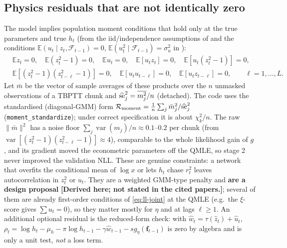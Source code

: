 \documentclass[11pt]{article}
\newcommand{\F}{\mathcal{F}}
\newcommand{\E}{\mathbb{E}}
\newcommand{\derived}{\textbf{[Derived here; not stated in the cited papers.]}}
\begin{document}
\subsection{Physics residuals that are not identically zero}
The model implies population moment conditions that hold only at the true parameters and
true $h_t$ (from the iid/independence assumptions of \cite{HHS2012} and the conditions
$\E(u_t\mid z_t,\F_{t-1})=0$, $\E(u_t^2\mid\F_{t-1})=\sigma_u^2$ in \cite{HH2016}):
\begin{equation}\label{eq:moments}
\begin{aligned}
&\E z_t=0, \quad \E(z_t^2-1)=0, \quad \E u_t=0,\quad \E[u_t z_t]=0,\quad \E[u_t(z_t^2-1)]=0,\\
&\E[(z_t^2-1)(z_{t-\ell}^2-1)]=0,\quad \E[u_tu_{t-\ell}]=0,\quad \E[u_t z_{t-\ell}]=0,\qquad \ell=1,\dots,L .
\end{aligned}
\end{equation}
Let $\bar m$ be the vector of sample averages of these products over the $n$ unmasked
observations of a TBPTT chunk and $\widehat{\rm se}_j^2=\overline{m_j^2}/n$ (detached). The
code uses the standardised (diagonal-GMM) form
$\mathcal R_{\text{moment}}=\frac1n\sum_j \bar m_j^2/\widehat{\rm se}_j^2$ (\texttt{moment\_standardize});
under correct specification it is about $\chi^2_k/n$. The raw $\|\bar m\|^2$ has a noise floor
$\sum_j\operatorname{var}(m_j)/n\approx0.1$--$0.2$ per chunk (from $\operatorname{var}[(z_t^2-1)(z_{t-\ell}^2-1)]\approx4$),
comparable to the whole likelihood gain of $g$, and its gradient moved the econometric parameters
off the QMLE, so stage 2 never improved the validation NLL.
These are genuine constraints: a network that overfits the conditional mean of $\log x$ or
lets $h_t$ chase $r_t^2$ leaves autocorrelation in $z_t^2$ or $u_t$. They are a weighted
GMM-type penalty and \textbf{are a design proposal} \derived; several of them are already
first-order conditions of \eqref{eq:ll-joint} at the QMLE (e.g.\ the $\xi$-score gives
$\sum u_t=0$), so they matter mostly for $\eta$ and at lags $\ell\ge1$.
An additional optional residual is the reduced-form check: with $\hat w_t=\tau(\hat z_t)+\hat u_t$,
$\rho_t=\log h_t-\mu_h-\pi\log h_{t-1}-\gamma\hat w_{t-1}-s g_\eta(\mathbf f_{t-1})$ is zero
by algebra and is only a unit test, \emph{not} a loss term.
\end{document}
